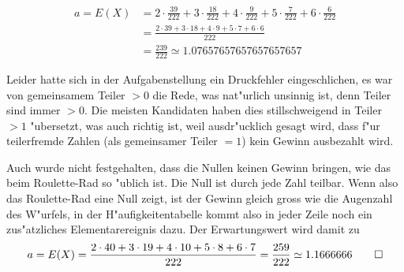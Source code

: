 \begin{loesung}
\begin{teilaufgaben}
\begin{align*}
a=E(X)&=2\cdot \frac{39}{222}+3\cdot\frac{18}{222}+4\cdot\frac{9}{222}
+5\cdot\frac{7}{222}+6\cdot\frac6{222}
\\
&=\frac{
2\cdot 39+3\cdot 18+4\cdot 9+5\cdot 7 +6\cdot 6
}{222}
\\
&=\frac{ 239 }{222}
\simeq 1.07657657657657657657
\end{align*}
\end{teilaufgaben}
Leider hatte sich in der Aufgabenstellung ein Druckfehler eingeschlichen,
es war von gemeinsamem Teiler $> 0$ die Rede, was nat"urlich unsinnig ist,
denn Teiler sind immer $> 0$. Die meisten Kandidaten haben dies stillschweigend
in Teiler $>1$ "ubersetzt, was auch richtig ist, weil ausdr"ucklich
gesagt wird, dass f"ur teilerfremde Zahlen (als gemeinsamer Teiler $= 1$)
kein Gewinn ausbezahlt wird.

Auch wurde nicht festgehalten,
dass die Nullen keinen Gewinn bringen, wie das beim Roulette-Rad so
"ublich ist. Die Null ist durch jede Zahl teilbar. Wenn also das Roulette-Rad
eine Null zeigt, ist der Gewinn gleich gross wie die Augenzahl des W"urfels,
in der H"aufigkeitentabelle kommt also in jeder Zeile noch ein zus"atzliches
Elementarereignis dazu. Der Erwartungswert wird damit zu
\[
a=E(X)=
\frac{2\cdot 40+3\cdot 19+4\cdot 10+5\cdot 8+6\cdot 7}{222}
=
\frac{259}{222}
\simeq
1.1666666
\qedhere
\]
\end{loesung}

